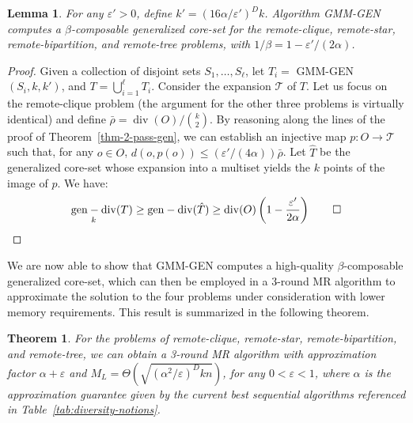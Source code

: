\documentclass{article}
\newtheorem{theorem}{Theorem}
\newtheorem{lemma}{Lemma}
\DeclareMathOperator{\diversity}{div}
\DeclareMathOperator{\gendiv}{gen-div}
\renewcommand{\epsilon}{\varepsilon}
\newcommand{\BT}[1]{\Theta\left( #1 \right)}
\begin{document}
\begin{lemma}\label{lem:gmm-gen-core-set}
For any $\epsilon' >0$, define $k'=(16\alpha/\epsilon')^D k$.
Algorithm {\sc GMM-GEN} computes a $\beta$-composable generalized
core-set for the remote-clique, remote-star, remote-bipartition, and
remote-tree problems, with $1/\beta = 1 - \epsilon'/(2\alpha)$.
\end{lemma}
\begin{proof}
Given a collection of disjoint sets $S_1,\dots, S_\ell$, let $T_i =$
{\sc GMM-GEN}$(S_i,k,k')$, and $T=\bigcup_{i=1}^{\ell} T_i$.  Consider
the expansion $\mathcal{T}$ of $T$.  Let us focus on the remote-clique
problem (the argument for the other three problems is virtually
identical) and define $\bar{\rho} = \diversity(O) /{k\choose 2}$.  By
reasoning along the lines of the proof of
Theorem~\ref{thm-2-pass-gen}, we can establish an injective map $p:
O\rightarrow \mathcal{T}$ such that, for any $o\in O$, $d(o, p(o))\le
(\epsilon'/(4\alpha))\bar{\rho}$.  Let $\hat{T}$ be the generalized
core-set whose expansion into a multiset yields the $k$ points of the
image of $p$. We have:
\[
 \gendiv_k(T) 
 \ge \gendiv(\hat{T})
 \ge \diversity(O)\left(1-\frac{\epsilon'}{2\alpha}\right)
 \qed
\]
\end{proof}
We are now able to show that {\sc GMM-GEN}
computes a high-quality $\beta$-composable generalized core-set, which
can then be employed in a 3-round MR algorithm to approximate the
solution to the four problems under consideration with lower memory
requirements.
This result is summarized in the following theorem.
\begin{theorem}\label{thm:3-rounds-gen}
  For the problems of remote-clique, remote-star, remote-bipartition,
  and remote-tree, we can obtain a 3-round MR algorithm with
  approximation factor $\alpha+\epsilon$ and
  $M_L=\BT{\sqrt{(\alpha^2/\epsilon)^Dkn}}$, for any $0< \epsilon <1$,
  where $\alpha$ is the approximation guarantee given by the current
  best sequential algorithms referenced in
  Table~\ref{tab:diversity-notions}.
\end{theorem}
\end{document}
